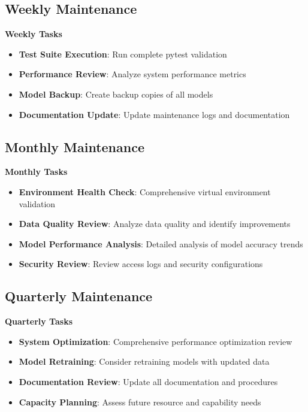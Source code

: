 \subsection{Weekly Maintenance}

\textbf{Weekly Tasks}
\begin{itemize}
	\item \textbf{Test Suite Execution}: Run complete pytest validation
	\item \textbf{Performance Review}: Analyze system performance metrics
	\item \textbf{Model Backup}: Create backup copies of all models
	\item \textbf{Documentation Update}: Update maintenance logs and documentation
\end{itemize}

\subsection{Monthly Maintenance}

\textbf{Monthly Tasks}
\begin{itemize}
	\item \textbf{Environment Health Check}: Comprehensive virtual environment validation
	\item \textbf{Data Quality Review}: Analyze data quality and identify improvements
	\item \textbf{Model Performance Analysis}: Detailed analysis of model accuracy trends
	\item \textbf{Security Review}: Review access logs and security configurations
\end{itemize}

\subsection{Quarterly Maintenance}

\textbf{Quarterly Tasks}
\begin{itemize}
	\item \textbf{System Optimization}: Comprehensive performance optimization review
	\item \textbf{Model Retraining}: Consider retraining models with updated data
	\item \textbf{Documentation Review}: Update all documentation and procedures
	\item \textbf{Capacity Planning}: Assess future resource and capability needs
\end{itemize}

